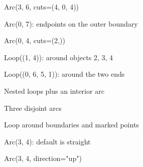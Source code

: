 \documentclass{article}
\begin{document}
\clearpage
\begin{center}
\Large Arc(3, 6, cuts=(4, 0, 4))\par\bigskip
{}
\end{center}
\clearpage
\begin{center}
\Large Arc(0, 7): endpoints on the outer boundary\par\bigskip
{}
\end{center}
\clearpage
\begin{center}
\Large Arc(0, 4, cuts=(2,))\par\bigskip
{}
\end{center}
\clearpage
\begin{center}
\Large Loop((1, 4)): around objects 2, 3, 4\par\bigskip
{}
\end{center}
\clearpage
\begin{center}
\Large Loop((0, 6, 5, 1)): around the two ends\par\bigskip
{}
\end{center}
\clearpage
\begin{center}
\Large Nested loops plus an interior arc\par\bigskip
{}
\end{center}
\clearpage
\begin{center}
\Large Three disjoint arcs\par\bigskip
{}
\end{center}
\clearpage
\begin{center}
\Large Loop around boundaries and marked points\par\bigskip
{}
\end{center}
\clearpage
\begin{center}
\Large Arc(3, 4): default is straight\par\bigskip
{}
\end{center}
\clearpage
\begin{center}
\Large Arc(3, 4, direction="up")\par\bigskip
{}
\end{center}
\end{document}
